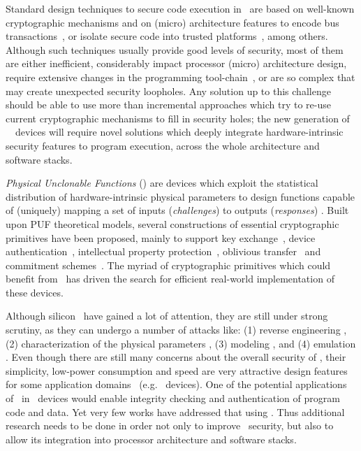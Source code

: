 

Standard design techniques to secure code execution in \socs~are based on well-known cryptographic mechanisms and on (micro) architecture features to encode bus transactions~\cite{Elbaz2005}, or isolate secure code into trusted platforms~\cite{tpm_spec}, among others. Although such techniques usually provide good levels of security, most of them are either inefficient, considerably impact processor (micro) architecture design, require extensive changes in the programming tool-chain~\cite{Suh2003a}, or are so complex \cite{Suh2005} that may create unexpected security loopholes. Any solution up to this challenge should be able to use more than incremental approaches which try to re-use current cryptographic mechanisms to fill in security holes; the new generation of \iot~\soc~devices will require novel solutions which deeply integrate hardware-intrinsic security features to program execution, across the whole architecture and software stacks.

\textit{Physical Unclonable Functions} (\pufs) are devices which exploit the statistical distribution of hardware-intrinsic physical parameters to design functions capable of (uniquely) mapping a set of inputs (\textit{challenges}) to outputs (\textit{responses}) \cite{PRTG02}. Built upon PUF theoretical models, several constructions of essential cryptographic primitives have been proposed, mainly to support key exchange~\cite{LLG05,STO05,BFSK11}, device authentication~\cite{Suh2007}, intellectual property protection~\cite{GKST07}, oblivious transfer~\cite{R10,BFSK11} and commitment schemes~\cite{BFSK11}. The myriad of cryptographic primitives which could benefit from \pufs~has driven the search for efficient real-world implementation of these devices.

Although silicon \pufs~have gained a lot of attention, they are still under strong scrutiny, as they can undergo a number of attacks like: (1) reverse engineering \cite{Nedospasov2013}, (2) characterization of the physical parameters \cite{Tajik2014}, (3) modeling \cite{Becker2015}, and (4) emulation \cite{Helfmeier2013}. Even though there are still many concerns about the overall security of \pufs, their simplicity, low-power consumption and speed are very attractive design features for some application domains~\cite{1502786} (e.g. \iot~devices). One of the potential applications of \pufs~in \iot~devices would enable integrity checking and authentication of program code and data. Yet very few works have addressed that using \pufs\cite{Suh2005}. Thus additional research needs to be done in order not only to improve \puf~security, but also to allow its integration into processor architecture and software stacks.

